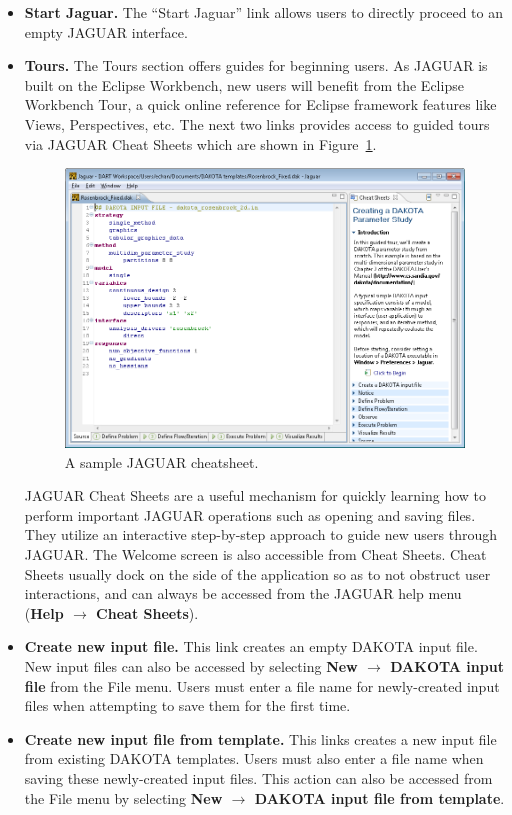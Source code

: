 \begin{itemize}
\item {\bf Start Jaguar.}  The ``Start Jaguar'' link allows users to
  directly proceed to an empty JAGUAR interface.  

\item {\bf Tours.} The Tours section offers guides for beginning
users.  As JAGUAR is built on the Eclipse Workbench, new users will
benefit from the Eclipse Workbench Tour, a quick online reference for
Eclipse framework features like Views, Perspectives, etc.  The next
two links provides access to guided tours via JAGUAR Cheat Sheets
which are shown in Figure~\ref{fig:input:jag_cheatsheets}.
\begin{figure}
  \centering
  \includegraphics[scale=0.6]{images/2_1jag_cheatsheets}
  \caption{A sample JAGUAR cheatsheet.}
  \label{fig:input:jag_cheatsheets}
\end{figure}
JAGUAR Cheat Sheets are a useful mechanism for quickly learning how to
perform important JAGUAR operations such as opening and saving files.
They utilize an interactive step-by-step approach to guide new users
through JAGUAR. The Welcome screen is also accessible from Cheat Sheets. 
Cheat Sheets usually dock on the side of the application so
as to not obstruct user interactions, and can always be accessed from
the JAGUAR help menu ({\bf Help $\rightarrow$ Cheat Sheets}).

\item {\bf Create new input file.}  This link creates an empty DAKOTA
  input file.  New input files can also be accessed by selecting {\bf
    New $\rightarrow$ DAKOTA input file} from the File menu.  Users
  must enter a file name for newly-created input files when attempting
  to save them for the first time.

\item {\bf Create new input file from template.} This links creates a
  new input file from existing DAKOTA templates. Users must also
  enter a file name when saving these newly-created input files. This
  action can also be accessed from the File menu by selecting {\bf New
  $\rightarrow$ DAKOTA input file from template}.

\end{itemize}

